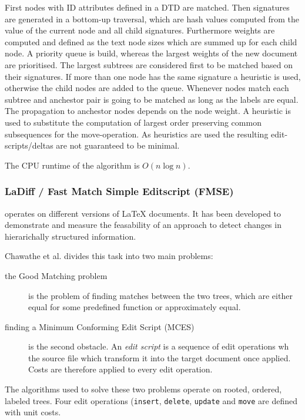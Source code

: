 First nodes with ID attributes defined in a DTD are matched. Then signatures are generated in a bottom-up traversal, which are hash values computed from the value of the current node and all child signatures. Furthermore weights are computed and defined as the text node sizes which are summed up for each child node. A priority queue is build, whereas the largest weights of the new document are prioritised. The largest subtrees are considered first to be matched based on their signatures. If more than one node has the same signature a heuristic is used, otherwise the child nodes are added to the queue. Whenever nodes match each subtree and anchestor pair is going to be matched as long as the labels are equal. The propagation to anchestor nodes depends on the node weight. A heuristic is used to substitute the computation of largest order preserving common subsequences for the move-operation. As heuristics are used the resulting edit-scripts/deltas are not guaranteed to be minimal.

The CPU runtime of the algorithm is $O(n \log n)$.

\subsubsection{LaDiff / Fast Match Simple Editscript (FMSE)\cite{chawathe1996change}}\label{subsec::ladiff}
operates on different versions of LaTeX documents. It has been developed to demonstrate and measure the feasability of an approach to detect changes in hierarichally structured information.

Chawathe et al. divides this task into two main problems:

\begin{description}
\item[the Good Matching problem] is the problem of finding matches between the two trees, which are either equal for some predefined function or approximately equal.
\item[finding a Minimum Conforming Edit Script (MCES)] is the second obstacle. An \emph{edit script} is a sequence of edit operations wh the source file which transform it into the target document once applied. Costs are therefore applied to every edit operation.
\end{description}

The algorithms used to solve these two problems operate on rooted, ordered, labeled trees. Four edit operations (\texttt{insert}, \texttt{delete}, \texttt{update} and \texttt{move} are defined with unit costs.

